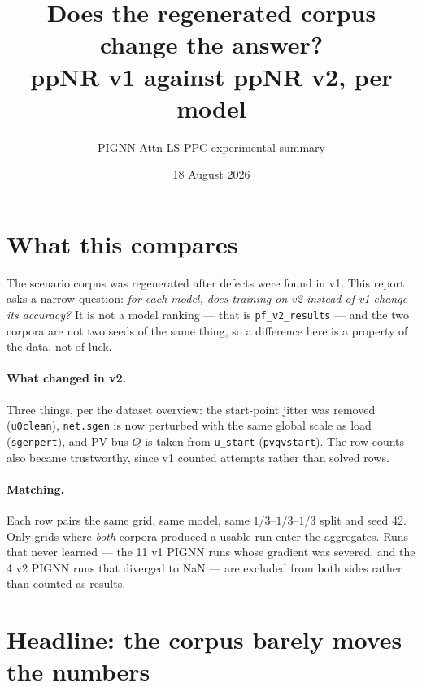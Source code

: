 \documentclass[10pt]{article}
\title{Does the regenerated corpus change the answer?\\\large ppNR v1 against ppNR v2, per model}
\author{PIGNN-Attn-LS-PPC experimental summary}
\date{18 August 2026}
\begin{document}
\maketitle

\section{What this compares}

The scenario corpus was regenerated after defects were found in v1. This report
asks a narrow question: \emph{for each model, does training on v2 instead of v1
change its accuracy?} It is not a model ranking --- that is
\texttt{pf\_v2\_results} --- and the two corpora are not two seeds of the same
thing, so a difference here is a property of the data, not of luck.

\paragraph{What changed in v2.} Three things, per the dataset overview: the
start-point jitter was removed (\texttt{u0clean}), \texttt{net.sgen} is now
perturbed with the same global scale as load (\texttt{sgenpert}), and PV-bus $Q$
is taken from \texttt{u\_start} (\texttt{pvqvstart}). The row counts also became
trustworthy, since v1 counted attempts rather than solved rows.

\paragraph{Matching.} Each row pairs the same grid, same model, same
$1/3$--$1/3$--$1/3$ split and seed 42. Only grids where \emph{both} corpora
produced a usable run enter the aggregates. Runs that never learned --- the 11
v1 PIGNN runs whose gradient was severed, and the 4 v2 PIGNN runs that diverged
to NaN --- are excluded from both sides rather than counted as results.

\section{Headline: the corpus barely moves the numbers}
\end{document}
